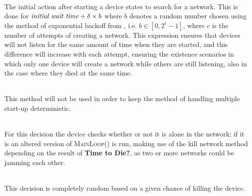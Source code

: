 \begin{description}[labelindent=\parindent]
    \item[Search for network]\hfill\\
    The initial action after starting a device states to search for a network.
    This is done for $\text{\textit{initial wait time}} + \delta \times b$ where $b$ denotes a random number chosen using the method of exponential backoff from , i.e. $b \in [0, 2^c-1]$, where $c$ is the number of attempts of creating a network.
    This expression ensures that devices will not listen for the same amount of time when they are started, and this difference will increase with each attempt, ensuring the existence scenarios in which only one device will create a network while others are still listening, also in the case where they died at the same time.
    \item[Chance of creating a network]\hfill\\
    This method will not be used in order to keep the method of handling multiple start-up deterministic.
    \item[Alone in network?]\hfill\\
    For this decision the device checks whether or not it is alone in the network; if it is an altered version of \textsc{MainLoop()} is run, making use of the kill network method depending on the result of \textbf{Time to Die?}, as two or more networks could be jamming each other.
    \item[Time to Die?]\hfill\\
    This decision is completely random based on a given chance of killing the device.
\end{description}


